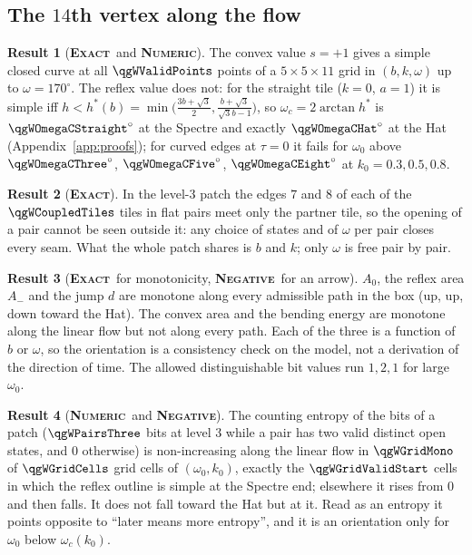 \documentclass[11pt]{article}
\newcommand{\exact}{\textbf{\textsc{Exact}}}
\newcommand{\numeric}{\textbf{\textsc{Numeric}}}
\newcommand{\negres}{\textbf{\textsc{Negative}}}
\theoremstyle{definition}
\newtheorem{result}{Result}
\begin{document}
\subsection{The $14$th vertex along the flow}
\begin{result}[\exact\ and \numeric]\label{res:flow-validity}
The convex value $s=+1$ gives a simple closed curve at all $\qgWValidPoints$ points of a $5\times5\times11$ grid in $(b,k,\omega)$ up to $\omega=170^\circ$. The reflex value does not: for the straight tile ($k=0$, $a=1$) it is simple iff $h<h^*(b)=\min\bigl(\tfrac{3b+\sqrt3}{2},\tfrac{b+\sqrt3}{\sqrt3b-1}\bigr)$, so $\omega_c=2\arctan h^*$ is $\qgWOmegaCStraight^\circ$ at the Spectre and exactly $\qgWOmegaCHat^\circ$ at the Hat (Appendix~\ref{app:proofs}); for curved edges at $\tau=0$ it fails for $\omega_0$ above $\qgWOmegaCThree^\circ$, $\qgWOmegaCFive^\circ$, $\qgWOmegaCEight^\circ$ at $k_0=0.3,0.5,0.8$.
\end{result}
\begin{result}[\exact]\label{res:flow-decouple}
In the level-$3$ patch the edges $7$ and $8$ of each of the $\qgWCoupledTiles$ tiles in flat pairs meet only the partner tile, so the opening of a pair cannot be seen outside it: any choice of states and of $\omega$ per pair closes every seam. What the whole patch shares is $b$ and $k$; only $\omega$ is free pair by pair.
\end{result}
\begin{result}[\exact\ for monotonicity, \negres\ for an arrow]\label{res:flow-arrow}
$A_0$, the reflex area $A_-$ and the jump $d$ are monotone along every admissible path in the box (up, up, down toward the Hat). The convex area and the bending energy are monotone along the linear flow but not along every path. Each of the three is a function of $b$ or $\omega$, so the orientation is a consistency check on the model, not a derivation of the direction of time. The allowed distinguishable bit values run $1,2,1$ for large $\omega_0$.
\end{result}
\begin{result}[\numeric\ and \negres]\label{res:flow-entropy}
The counting entropy of the bits of a patch ($\qgWPairsThree$ bits at level $3$ while a pair has two valid distinct open states, and $0$ otherwise) is non-increasing along the linear flow in $\qgWGridMono$ of $\qgWGridCells$ grid cells of $(\omega_0,k_0)$, exactly the $\qgWGridValidStart$ cells in which the reflex outline is simple at the Spectre end; elsewhere it rises from $0$ and then falls. It does not fall toward the Hat but at it. Read as an entropy it points opposite to ``later means more entropy'', and it is an orientation only for $\omega_0$ below $\omega_c(k_0)$.
\end{result}
\end{document}
